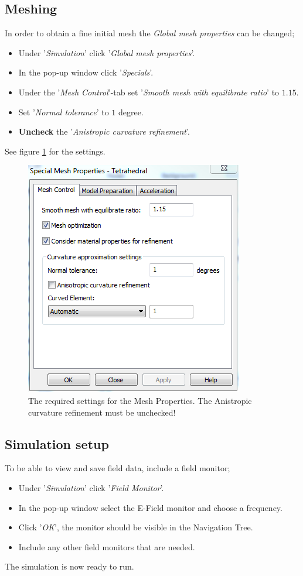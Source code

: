 \subsection{Meshing}
In order to obtain a fine initial mesh the \textit{Global mesh properties} can be changed;
\begin{itemize}
	\item Under '\textit{Simulation}' click '\textit{Global mesh properties}'.
	\item In the pop-up window click '\textit{Specials}'.
	\item Under the '\textit{Mesh Control}'-tab set '\textit{Smooth mesh with equilibrate ratio}' to \(1.15\).
	\item Set '\textit{Normal tolerance}' to \(1\) degree.
	\item \textbf{Uncheck} the '\textit{Anistropic curvature refinement}'.  
\end{itemize}
See figure \ref{fig:MeshProperties} for the settings.
\begin{figure}[h]
	\begin{center}
		\includegraphics[scale = .6]{Figures/MeshProperties}
		\caption{The required settings for the Mesh Properties. The Anistropic curvature refinement must be unchecked!}
		\label{fig:MeshProperties}
	\end{center}
\end{figure}

\subsection{Simulation setup}
To be able to view and save field data, include a field monitor;
\begin{itemize}
	\item Under '\textit{Simulation}' click '\textit{Field Monitor}'.
	\item In the pop-up window select the E-Field monitor and choose a frequency.
	\item Click '\textit{OK}', the monitor should be visible in the Navigation Tree.
	\item Include any other field monitors that are needed.
\end{itemize}
The simulation is now ready to run.

